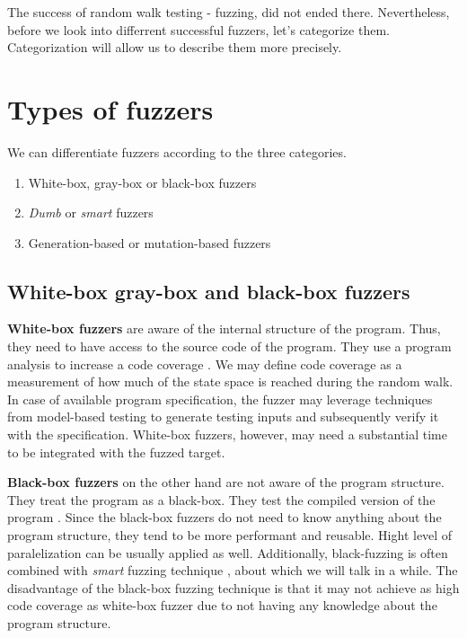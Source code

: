 The success of random walk testing - fuzzing, did not ended there. Nevertheless, before we look into differrent successful fuzzers, let's categorize them. Categorization will allow us to describe them more precisely.


\section{Types of fuzzers}
\label{sub:Types of fuzzers}
We can differentiate fuzzers according to the three categories.
\begin{enumerate}
    \item White-box, gray-box or black-box fuzzers
    \item \emph{Dumb} or \emph{smart} fuzzers
    \item Generation-based or mutation-based fuzzers
\end{enumerate}

\subsection{White-box gray-box and black-box fuzzers}
\label{ssub:White-box gray-box and black-box fuzzers}
\textbf{White-box fuzzers} are aware of the internal structure of the program. Thus, they need to have access to the source code of the program. They use a program analysis to increase a code coverage \cite{neystadt2008automated}. We may define code coverage as a measurement of how much of the state space is reached during the random walk. In case of available program specification, the fuzzer may leverage techniques from model-based testing to generate testing  inputs and subsequently verify it with the specification. White-box fuzzers, however, may need a substantial time to be integrated with the fuzzed target.

\textbf{Black-box fuzzers} on the other hand are not aware of the program structure. They treat the program as a black-box. They test the compiled version of the program \cite{takanen2018fuzzing}. Since the black-box fuzzers do not need to know anything about the program structure, they tend to be more performant and reusable. Hight level of paralelization can be usually applied as well. Additionally, black-fuzzing is often combined with \emph{smart} fuzzing technique \cite{neystadt2008automated}, about which we will talk in a while. The disadvantage of the black-box fuzzing technique is that it may not achieve as high code coverage as white-box fuzzer due to not having any knowledge about the program structure.

